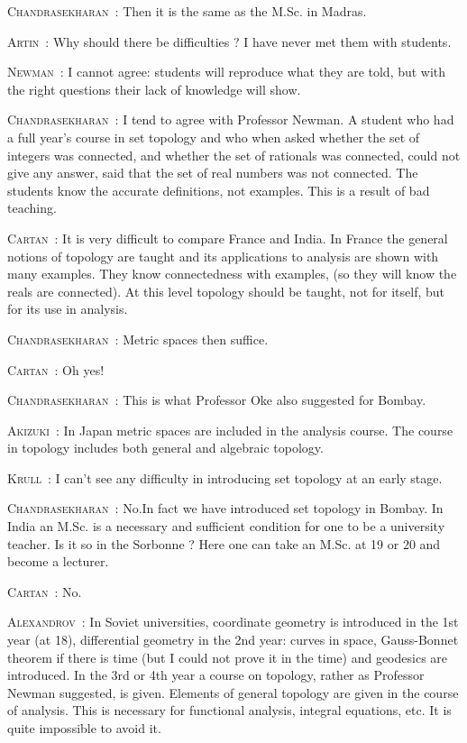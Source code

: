 \smallskip
\noindent
\textsc{Chandrasekharan}~: Then it is the same as the M.Sc. in Madras.

\smallskip
\noindent
\textsc{Artin}~: Why should there be difficulties ? I have never met them with students.

\smallskip
\noindent
\textsc{Newman}~: I cannot agree: students will reproduce what they are told, but with the right questions their lack of knowledge will show.

\smallskip
\noindent
\textsc{Chandrasekharan}~: I tend to agree with Professor Newman. A student who had a full year's course in set topology and who when asked whether the set of integers was connected, and whether the set of rationals was connected, could not give any answer, said that the set of real numbers was not connected. The students know the accurate definitions, not examples. This is a result of bad teaching.

\smallskip
\noindent
\textsc{Cartan}~: It is very difficult to compare France and India. In France the general notions of topology are taught and its applications to analysis are shown with many examples. They know connectedness with examples, (so they will know the reals are connected). At this level topology should be taught, not for itself, but for its use in analysis.

\smallskip
\noindent
\textsc{Chandrasekharan}~: Metric spaces then suffice.

\smallskip
\noindent
\textsc{Cartan}~: Oh yes!

\smallskip
\noindent
\textsc{Chandrasekharan}~: This is what Professor Oke also suggested for Bombay.

\smallskip
\noindent
\textsc{Akizuki}~: In Japan metric spaces are included in the analysis course. The course in topology includes both general and algebraic topology.

\smallskip
\noindent
\textsc{Krull}~: I can't see any difficulty in introducing set topology at an early stage.

\smallskip
\noindent
\textsc{Chandrasekharan}~: No.\pageoriginale In fact we have introduced set topology in Bombay. In India an M.Sc. is a necessary and sufficient condition for one to be a university teacher. Is it so in the Sorbonne ? Here one can take an M.Sc. at 19 or 20 and become a lecturer.

\smallskip
\noindent
\textsc{Cartan}~: No.

\smallskip
\noindent
\textsc{Alexandrov}~: In Soviet universities, coordinate geometry is introduced in the 1st year (at 18), differential geometry in the 2nd year: curves in space, Gauss-Bonnet theorem if there is time (but I could not prove it in the time) and geodesics are introduced. In the 3rd or 4th year a course on topology, rather as Professor Newman suggested, is given. Elements of general topology are given in the course of analysis. This is necessary for functional analysis, integral equations, etc. It is quite impossible to avoid it.

